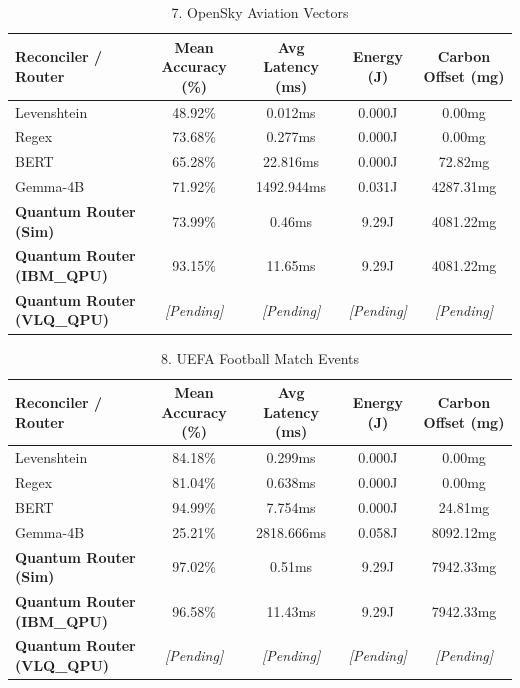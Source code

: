 
\begin{table}[htbp]
  \centering
  \caption{7. OpenSky Aviation Vectors}
  \label{tab:7__opensky_aviation_vectors}
  \begin{tabular}{lcccc}
    \hline
    \textbf{Reconciler / Router} & \textbf{Mean Accuracy (\%)} & \textbf{Avg Latency (ms)} & \textbf{Energy (J)} & \textbf{Carbon Offset (mg)} \\
    \hline
    Levenshtein & 48.92\% & 0.012ms & 0.000J & 0.00mg \\
    Regex & 73.68\% & 0.277ms & 0.000J & 0.00mg \\
    BERT & 65.28\% & 22.816ms & 0.000J & 72.82mg \\
    Gemma-4B & 71.92\% & 1492.944ms & 0.031J & 4287.31mg \\
    \textbf{Quantum Router (Sim)} & 73.99\% & 0.46ms & 9.29J & 4081.22mg \\
    \textbf{Quantum Router (IBM\_QPU)} & 93.15\% & 11.65ms & 9.29J & 4081.22mg \\
    \textbf{Quantum Router (VLQ\_QPU)} & \textit{[Pending]} & \textit{[Pending]} & \textit{[Pending]} & \textit{[Pending]} \\
    \hline
  \end{tabular}
\end{table}



\begin{table}[htbp]
  \centering
  \caption{8. UEFA Football Match Events}
  \label{tab:8__uefa_football_match_events}
  \begin{tabular}{lcccc}
    \hline
    \textbf{Reconciler / Router} & \textbf{Mean Accuracy (\%)} & \textbf{Avg Latency (ms)} & \textbf{Energy (J)} & \textbf{Carbon Offset (mg)} \\
    \hline
    Levenshtein & 84.18\% & 0.299ms & 0.000J & 0.00mg \\
    Regex & 81.04\% & 0.638ms & 0.000J & 0.00mg \\
    BERT & 94.99\% & 7.754ms & 0.000J & 24.81mg \\
    Gemma-4B & 25.21\% & 2818.666ms & 0.058J & 8092.12mg \\
    \textbf{Quantum Router (Sim)} & 97.02\% & 0.51ms & 9.29J & 7942.33mg \\
    \textbf{Quantum Router (IBM\_QPU)} & 96.58\% & 11.43ms & 9.29J & 7942.33mg \\
    \textbf{Quantum Router (VLQ\_QPU)} & \textit{[Pending]} & \textit{[Pending]} & \textit{[Pending]} & \textit{[Pending]} \\
    \hline
  \end{tabular}
\end{table}



